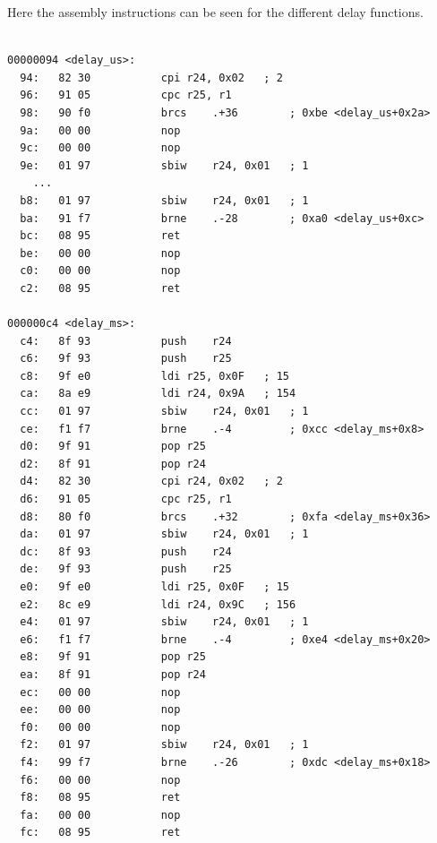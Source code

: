 \documentclass{article}
\begin{document}
Here the assembly instructions can be seen for the different delay functions.
\begin{verbatim}

00000094 <delay_us>:
  94:	82 30       	cpi	r24, 0x02	; 2
  96:	91 05       	cpc	r25, r1
  98:	90 f0       	brcs	.+36     	; 0xbe <delay_us+0x2a>
  9a:	00 00       	nop
  9c:	00 00       	nop
  9e:	01 97       	sbiw	r24, 0x01	; 1
	...
  b8:	01 97       	sbiw	r24, 0x01	; 1
  ba:	91 f7       	brne	.-28     	; 0xa0 <delay_us+0xc>
  bc:	08 95       	ret
  be:	00 00       	nop
  c0:	00 00       	nop
  c2:	08 95       	ret

000000c4 <delay_ms>:
  c4:	8f 93       	push	r24
  c6:	9f 93       	push	r25
  c8:	9f e0       	ldi	r25, 0x0F	; 15
  ca:	8a e9       	ldi	r24, 0x9A	; 154
  cc:	01 97       	sbiw	r24, 0x01	; 1
  ce:	f1 f7       	brne	.-4      	; 0xcc <delay_ms+0x8>
  d0:	9f 91       	pop	r25
  d2:	8f 91       	pop	r24
  d4:	82 30       	cpi	r24, 0x02	; 2
  d6:	91 05       	cpc	r25, r1
  d8:	80 f0       	brcs	.+32     	; 0xfa <delay_ms+0x36>
  da:	01 97       	sbiw	r24, 0x01	; 1
  dc:	8f 93       	push	r24
  de:	9f 93       	push	r25
  e0:	9f e0       	ldi	r25, 0x0F	; 15
  e2:	8c e9       	ldi	r24, 0x9C	; 156
  e4:	01 97       	sbiw	r24, 0x01	; 1
  e6:	f1 f7       	brne	.-4      	; 0xe4 <delay_ms+0x20>
  e8:	9f 91       	pop	r25
  ea:	8f 91       	pop	r24
  ec:	00 00       	nop
  ee:	00 00       	nop
  f0:	00 00       	nop
  f2:	01 97       	sbiw	r24, 0x01	; 1
  f4:	99 f7       	brne	.-26     	; 0xdc <delay_ms+0x18>
  f6:	00 00       	nop
  f8:	08 95       	ret
  fa:	00 00       	nop
  fc:	08 95       	ret


\end{verbatim}
\end{document}
